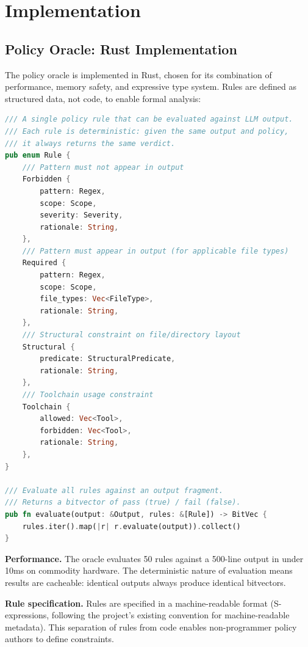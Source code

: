 \documentclass[11pt,a4paper]{article}
\begin{document}
\section{Implementation}
\label{sec:implementation}

\subsection{Policy Oracle: Rust Implementation}

The policy oracle is implemented in Rust, chosen for its combination
of performance, memory safety, and expressive type system.  Rules
are defined as structured data, not code, to enable formal analysis:

\begin{lstlisting}[language=Rust,caption={Oracle rule definition (simplified).}]
/// A single policy rule that can be evaluated against LLM output.
/// Each rule is deterministic: given the same output and policy,
/// it always returns the same verdict.
pub enum Rule {
    /// Pattern must not appear in output
    Forbidden {
        pattern: Regex,
        scope: Scope,
        severity: Severity,
        rationale: String,
    },
    /// Pattern must appear in output (for applicable file types)
    Required {
        pattern: Regex,
        scope: Scope,
        file_types: Vec<FileType>,
        rationale: String,
    },
    /// Structural constraint on file/directory layout
    Structural {
        predicate: StructuralPredicate,
        rationale: String,
    },
    /// Toolchain usage constraint
    Toolchain {
        allowed: Vec<Tool>,
        forbidden: Vec<Tool>,
        rationale: String,
    },
}

/// Evaluate all rules against an output fragment.
/// Returns a bitvector of pass (true) / fail (false).
pub fn evaluate(output: &Output, rules: &[Rule]) -> BitVec {
    rules.iter().map(|r| r.evaluate(output)).collect()
}
\end{lstlisting}

\textbf{Performance.}  The oracle evaluates 50 rules against a
500-line output in under 10ms on commodity hardware.  The
deterministic nature of evaluation means results are cacheable:
identical outputs always produce identical bitvectors.

\textbf{Rule specification.}  Rules are specified in a
machine-readable format (S-expressions, following the project's
existing convention for machine-readable metadata).  This
separation of rules from code enables non-programmer policy
authors to define constraints.
\end{document}

